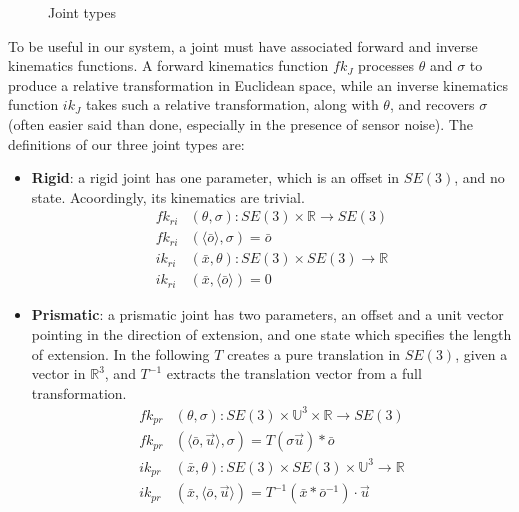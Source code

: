 \documentclass[letterpaper, 10 pt, conference]{ieeeconf}  %
\begin{document}
\begin{figure}[ht]
  \hfill
  \caption{Joint types}
  \label{fig:joint-types}
\end{figure}

To be useful in our system, a joint must have associated forward and inverse kinematics functions. A forward kinematics function $fk_J$ processes $\theta$ and $\sigma$ to produce a relative transformation in Euclidean space, while an inverse kinematics function $ik_J$ takes such a relative transformation, along with $\theta$, and recovers $\sigma$ (often easier said than done, especially in the presence of sensor noise). The definitions of our three joint types are:

\begin{itemize}
  \item \textbf{Rigid}: a rigid joint has one parameter, which is an offset in $SE(3)$, and no state. Acoordingly, its kinematics are trivial.
    \begin{align}
      fk_{ri}&(\theta, \sigma) : SE(3) \times \mathbb{R} \longrightarrow SE(3) \\
      fk_{ri}&(\langle \bar{o} \rangle, \sigma) = \bar{o} \nonumber\\
      ik_{ri}&(\bar{x}, \theta) : SE(3) \times SE(3) \longrightarrow \mathbb{R} \\
      ik_{ri}&(\bar{x}, \langle \bar{o} \rangle) = 0 \nonumber
    \end{align}
  \item \textbf{Prismatic}: a prismatic joint has two parameters, an offset and a unit vector pointing in the direction of extension, and one state which specifies the length of extension. In the following $T$ creates a pure translation in $SE(3)$, given a vector in $\mathbb{R}^3$, and $T^{-1}$ extracts the translation vector from a full transformation.
    \begin{align}
      fk_{pr}&(\theta, \sigma) : SE(3) \times \mathbb{U}^3 \times \mathbb{R} \longrightarrow SE(3) \\
      fk_{pr}&(\langle \bar{o}, \vec{u} \rangle, \sigma) = T(\sigma \vec{u}) * \bar{o} \nonumber\\
      ik_{pr}&(\bar{x}, \theta) : SE(3) \times SE(3) \times \mathbb{U}^3 \longrightarrow \mathbb{R} \\
      ik_{pr}&(\bar{x}, \langle \bar{o}, \vec{u} \rangle) = T^{-1}(\bar{x}*\bar{o}^{-1}) \cdot \vec{u} \nonumber

\end{align}
\end{itemize}
\end{document}
